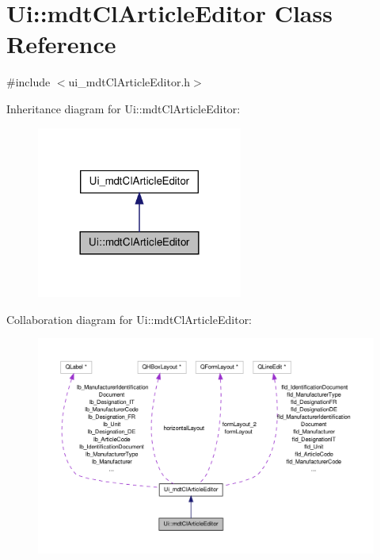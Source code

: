 \hypertarget{class_ui_1_1mdt_cl_article_editor}{\section{Ui\-:\-:mdt\-Cl\-Article\-Editor Class Reference}
\label{class_ui_1_1mdt_cl_article_editor}
}


{\ttfamily \#include $<$ui\-\_\-mdt\-Cl\-Article\-Editor.\-h$>$}



Inheritance diagram for Ui\-:\-:mdt\-Cl\-Article\-Editor\-:
\nopagebreak
\begin{figure}[H]
\begin{center}
\leavevmode
\includegraphics[width=192pt]{class_ui_1_1mdt_cl_article_editor__inherit__graph}
\end{center}
\end{figure}


Collaboration diagram for Ui\-:\-:mdt\-Cl\-Article\-Editor\-:
\nopagebreak
\begin{figure}[H]
\begin{center}
\leavevmode
\includegraphics[width=350pt]{class_ui_1_1mdt_cl_article_editor__coll__graph}
\end{center}
\end{figure}

